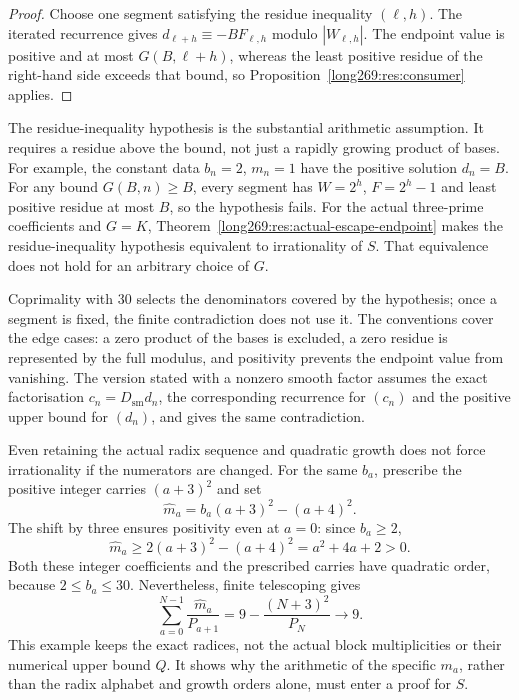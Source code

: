 \documentclass[11pt]{article}
\theoremstyle{remark}
\theoremstyle{plain}
\begin{document}
\begin{proof}
Choose one segment satisfying the residue inequality $(\ell,h)$.  The iterated recurrence gives
$d_{\ell+h}\equiv-BF_{\ell,h}$ modulo $|W_{\ell,h}|$.  The endpoint value is
positive and at most $G(B,\ell+h)$, whereas the least positive residue of
the right-hand side exceeds that bound, so Proposition~\ref{long269:res:consumer}
applies.
\end{proof}

The residue-inequality hypothesis is the substantial arithmetic assumption.  It
requires a residue above the bound, not just a rapidly growing product of
bases.  For example, the constant data $b_n=2$, $m_n=1$ have the positive
solution $d_n=B$.  For any bound $G(B,n)\ge B$, every segment has
$W=2^h$, $F=2^h-1$ and least positive residue at most $B$, so the
hypothesis fails.  For the actual three-prime coefficients and $G=K$,
Theorem~\ref{long269:res:actual-escape-endpoint} makes the residue-inequality hypothesis
equivalent to irrationality of $S$.  That equivalence does not hold for
an arbitrary choice of $G$.

Coprimality with $30$ selects the denominators covered by the hypothesis;
once a segment is fixed, the finite contradiction does not use it.  The conventions cover the edge cases: a zero product of the bases is excluded, a zero residue is
represented by the full modulus, and positivity prevents the endpoint value from vanishing.  The version stated with a nonzero smooth factor assumes the exact
factorisation $c_n=D_{\mathrm{sm}}d_n$, the corresponding recurrence for
$(c_n)$ and the positive upper bound for $(d_n)$, and gives the same
contradiction.

Even retaining the actual radix sequence and quadratic growth does not
force irrationality if the numerators are changed.  For the same $b_a$,
prescribe the positive integer carries $(a+3)^2$ and set
\[
 \widehat m_a=b_a(a+3)^2-(a+4)^2.
\]
The shift by three ensures positivity even at $a=0$: since $b_a\ge2$,
\[
 \widehat m_a\ge2(a+3)^2-(a+4)^2=a^2+4a+2>0.
\]
Both these integer coefficients and the prescribed carries have quadratic
order, because $2\le b_a\le30$.  Nevertheless, finite telescoping gives
\[
 \sum_{a=0}^{N-1}\frac{\widehat m_a}{P_{a+1}}
 =9-\frac{(N+3)^2}{P_N}\longrightarrow9.
\]
This example keeps the exact radices, not the actual block multiplicities
or their numerical upper bound $Q$.  It shows why the arithmetic of the
specific $m_a$, rather than the radix alphabet and growth orders alone,
must enter a proof for $S$.
\end{document}
